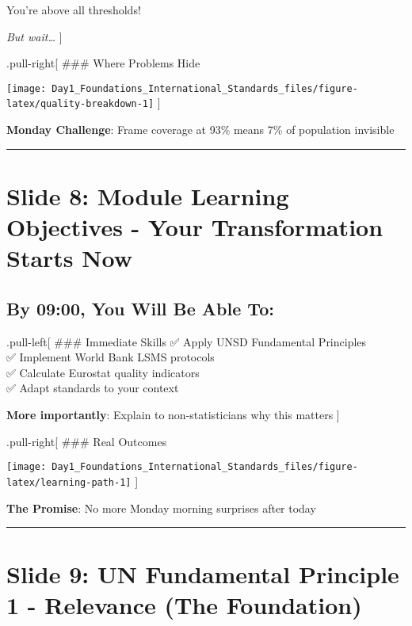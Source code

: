 \documentclass[
]{article}
\begin{document}
You're above all thresholds!

\emph{But wait\ldots{}} {]}

.pull-right{[} \#\#\# Where Problems Hide

\texttt{[image: Day1\_Foundations\_International\_Standards\_files/figure-latex/quality-breakdown-1]}
{]}

\textbf{Monday Challenge}: Frame coverage at 93\% means 7\% of
population invisible

\begin{center}\rule{0.5\linewidth}{0.5pt}\end{center}

\section{Slide 8: Module Learning Objectives - Your Transformation
Starts
Now}\label{slide-8-module-learning-objectives---your-transformation-starts-now}

\subsection{By 09:00, You Will Be Able
To:}\label{by-0900-you-will-be-able-to}

.pull-left{[} \#\#\# Immediate Skills ✅ Apply UNSD Fundamental
Principles\\
✅ Implement World Bank LSMS protocols\\
✅ Calculate Eurostat quality indicators\\
✅ Adapt standards to your context

\textbf{More importantly}: Explain to non-statisticians why this matters
{]}

.pull-right{[} \#\#\# Real Outcomes

\texttt{[image: Day1\_Foundations\_International\_Standards\_files/figure-latex/learning-path-1]}
{]}

\textbf{The Promise}: No more Monday morning surprises after today

\begin{center}\rule{0.5\linewidth}{0.5pt}\end{center}

\section{Slide 9: UN Fundamental Principle 1 - Relevance (The
Foundation)}\label{slide-9-un-fundamental-principle-1---relevance-the-foundation}
\end{document}
